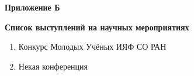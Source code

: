 \newpage
\begin{center}
	\textbf{Приложение Б}
	\vspace{20pt}
	
	\textbf{Список выступлений на научных мероприятиях \label{AppenndixB}}
\end{center}

\begin{enumerate}
	\item Конкурс Молодых Учёных ИЯФ СО РАН
	\item Некая конференция
\end{enumerate}


